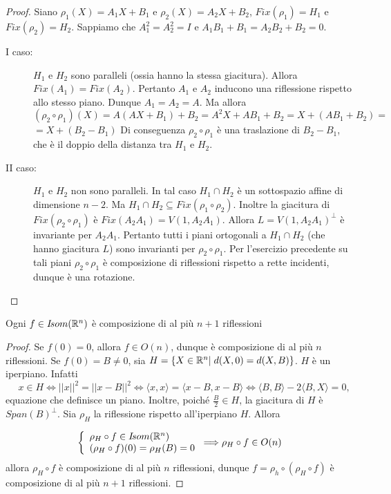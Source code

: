  \begin{proof}
Siano $\rho_1(X)=A_1X+B_1$ e $\rho_2(X)=A_2X+B_2$, $Fix(\rho_1)=H_1$ e
 $Fix(\rho_2)=H_2$. 
 Sappiamo che $A_1^2=A_2^2=I$ e $A_1B_1+B_1=A_2B_2+B_2=0$.
 
 \begin{description}
	\item[I caso:] $H_1$ e $H_2$ sono paralleli (ossia hanno la stessa giacitura).
		Allora $Fix(A_1)=Fix(A_2)$. Pertanto $A_1$ e $A_2$ inducono una riflessione rispetto allo stesso piano.
		Dunque $A_1=A_2=A$.
		Ma allora $(\rho_2\circ\rho_1)(X)=A(AX+B_1)+B_2=A^2X+AB_1+B_2=X+(AB_1+B_2)=$
		$=X+(B_2-B_1)$
		Di conseguenza $\rho_2\circ\rho_1$ è una traslazione di $B_2-B_1$, che è il doppio della distanza tra
		$H_1$ e $H_2$.
	\item[II caso: ] $H_1$ e $H_2$ non sono paralleli.
		In tal caso $H_1\cap H_2$ è un sottospazio affine di dimensione $n-2$.
		Ma $H_1\cap H_2\subseteq Fix(\rho_1\circ\rho_2)$.
		Inoltre la giacitura di $Fix(\rho_2\circ\rho_1)$ è
		$Fix(A_2A_1)=V(1,A_2A_1)$. Allora $L=V(1,A_2A_1)^{\bot}$ è invariante per $A_2A_1$.
		Pertanto tutti i piani ortogonali a $H_1\cap H_2$ (che hanno giacitura $L$) sono invarianti per
		$\rho_2\circ\rho_1$.
		Per l'esercizio precedente su tali piani $\rho_2\circ\rho_1$ è composizione di riflessioni rispetto a rette incidenti,
		dunque è una rotazione.
 \end{description}
 
 \end{proof}
 
 
 \begin{theorem}
	Ogni $f\in I\!som( \mathbb R^n)$ è composizione di al più $n+1$ riflessioni
 \end{theorem}
 
 \begin{proof}
 Se $f(0)=0$, allora $f\in O(n)$, dunque è composizione di al più $n$ 
 riflessioni.
 Se $f(0)=B\ne 0$, sia $H=\{X\in \mathbb R^n|\;d(X,0)=d(X,B)\}$.
 $H$ è un iperpiano. Infatti 
 \[
  \quad x\in H\Longleftrightarrow ||x||^2=||x-B||^2\Longleftrightarrow\langle x,x\rangle=
 \langle x-B,x-B\rangle\Longleftrightarrow\langle B,B\rangle-2\langle B,X\rangle=0,
 \]
 equazione che definisce un piano. Inoltre, poiché $\frac{B}{2}\in H$, la giacitura di $H$ è $Span(B)^{\bot}$.
 Sia $\rho_H$ la riflessione rispetto all'iperpiano $H$. Allora
 
 \[ \left\{
 \begin{array}{l}
  \rho_H\circ f\in I\!som( \mathbb R^n) \\
  (\rho_H\circ f)(0)=\rho_H(B)=0
 \end{array}
 \right.
 \Longrightarrow \rho_H\circ f\in O(n)
 \]
 allora $\rho_H\circ f$ è composizione di al più $n$ riflessioni, dunque $f=\rho_h\circ(\rho_H\circ f)$
 è composizione di al più $n+1$ riflessioni.
 \end{proof}
 
